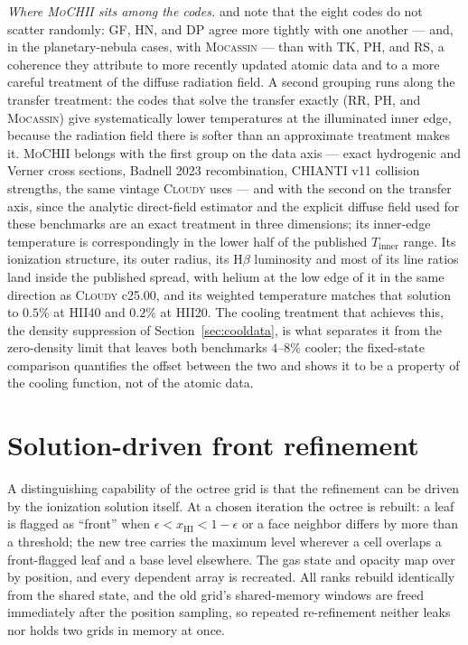 \documentclass[twocolumn,linenumbers]{aastex702}
\newcommand{\MoCHII}{\textsc{MoCHII}}
\newcommand{\xHI}{x_{\mathrm{HI}}}
\begin{document}
\emph{Where \MoCHII{} sits among the codes.}  \citet{pequignot2001} and
\citet{ercolano2003} note that the eight codes do not scatter randomly:
GF, HN, and DP agree more tightly with one another --- and, in the
planetary-nebula cases, with \textsc{Mocassin} --- than with TK, PH, and RS,
a coherence they attribute to more recently updated atomic data and to a
more careful treatment of the diffuse radiation field.  A second grouping
runs along the transfer treatment: the codes that solve the transfer exactly
(RR, PH, and \textsc{Mocassin}) give systematically lower temperatures at
the illuminated inner edge, because the radiation field there is softer than
an approximate treatment makes it.  \MoCHII{} belongs with the first group on
the data axis --- exact hydrogenic and Verner cross sections, Badnell 2023
recombination, CHIANTI v11 collision strengths, the same vintage
\textsc{Cloudy} uses --- and with the second on the transfer axis, since the
analytic direct-field estimator and the explicit diffuse field used for
these benchmarks are an exact treatment in three dimensions; its inner-edge
temperature is correspondingly in the lower half of the published
$T_{\mathrm{inner}}$ range.  Its ionization structure, its outer radius,
its H$\beta$ luminosity and most of its line ratios land inside the
published spread, with helium at the low edge of it in the same direction
as \textsc{Cloudy} c25.00, and its weighted temperature matches that
solution to $0.5\%$ at HII40 and $0.2\%$ at HII20.  The cooling treatment that
achieves this, the density suppression of Section~\ref{sec:cooldata}, is
what separates it from the zero-density limit that leaves both benchmarks
$4$--$8\%$ cooler; the fixed-state comparison quantifies the offset between
the two and shows it to be a property of the cooling function, not of the
atomic data.

\section{Solution-driven front refinement}
\label{sec:refine}

A distinguishing capability of the octree grid is that the refinement can
be driven by the ionization solution itself.  At a chosen iteration the
octree is rebuilt: a leaf is flagged as ``front'' when
$\epsilon < \xHI < 1-\epsilon$ or a face neighbor differs by more than a
threshold; the new tree carries the maximum level wherever a cell overlaps
a front-flagged leaf and a base level elsewhere.  The gas state and opacity
map over by position, and every dependent array is recreated.  All ranks
rebuild identically from the shared state, and the old grid's
shared-memory windows are freed immediately after the position sampling, so
repeated re-refinement neither leaks nor holds two grids in memory at
once.
\end{document}
